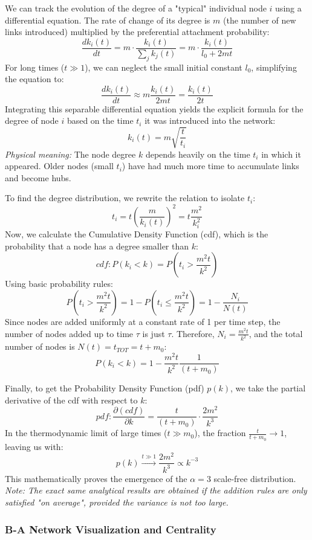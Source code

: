 We can track the evolution of the degree of a "typical" individual node \( i \) using a differential equation. The rate of change of its degree is \( m \) (the number of new links introduced) multiplied by the preferential attachment probability:
\[
    \frac{dk_i(t)}{dt} = m \cdot \frac{k_i(t)}{\sum_j k_j(t)} = m \cdot \frac{k_i(t)}{l_0 + 2mt}
\]
For long times (\( t \gg 1 \)), we can neglect the small initial constant \( l_0 \), simplifying the equation to:
\[
    \frac{dk_i(t)}{dt} \approx m \frac{k_i(t)}{2mt} = \frac{k_i(t)}{2t}
\]
Integrating this separable differential equation yields the explicit formula for the degree of node \( i \) based on the time \( t_i \) it was introduced into the network:
\[
    k_i(t) = m \sqrt{\frac{t}{t_i}}
\]
\textit{Physical meaning:} The node degree \( k \) depends heavily on the time \( t_i \) in which it appeared. Older nodes (small \( t_i \)) have had much more time to accumulate links and become hubs.

To find the degree distribution, we rewrite the relation to isolate \( t_i \):
\[
    t_i = t \left( \frac{m}{k_i(t)} \right)^2 = t \frac{m^2}{k_i^2}
\]
Now, we calculate the Cumulative Density Function (cdf), which is the probability that a node has a degree smaller than \( k \):
\[
    cdf: P(k_i < k) = P\left( t_i > \frac{m^2 t}{k^2} \right)
\]
Using basic probability rules:
\[
    P\left( t_i > \frac{m^2 t}{k^2} \right) = 1 - P\left( t_i \leq \frac{m^2 t}{k^2} \right) = 1 - \frac{N_i}{N(t)}
\]
Since nodes are added uniformly at a constant rate of 1 per time step, the number of nodes added up to time \( \tau \) is just \( \tau \). Therefore, \( N_i = \frac{m^2 t}{k^2} \), and the total number of nodes is \( N(t) = t_{TOT} = t + m_0 \):
\[
    P(k_i < k) = 1 - \frac{m^2 t}{k^2} \frac{1}{(t + m_0)}
\]

Finally, to get the Probability Density Function (pdf) \( p(k) \), we take the partial derivative of the cdf with respect to \( k \):
\[
    pdf: \frac{\partial (cdf)}{\partial k} = \frac{t}{(t + m_0)} \cdot \frac{2m^2}{k^3}
\]
In the thermodynamic limit of large times (\( t \gg m_0 \)), the fraction \( \frac{t}{t+m_0} \rightarrow 1 \), leaving us with:
\[
    p(k) \xrightarrow{t \gg 1} \frac{2m^2}{k^3} \propto k^{-3}
\]
This mathematically proves the emergence of the \( \alpha = 3 \) scale-free distribution. \textit{Note: The exact same analytical results are obtained if the addition rules are only satisfied "on average", provided the variance is not too large.}

\subsubsection{B-A Network Visualization and Centrality}

